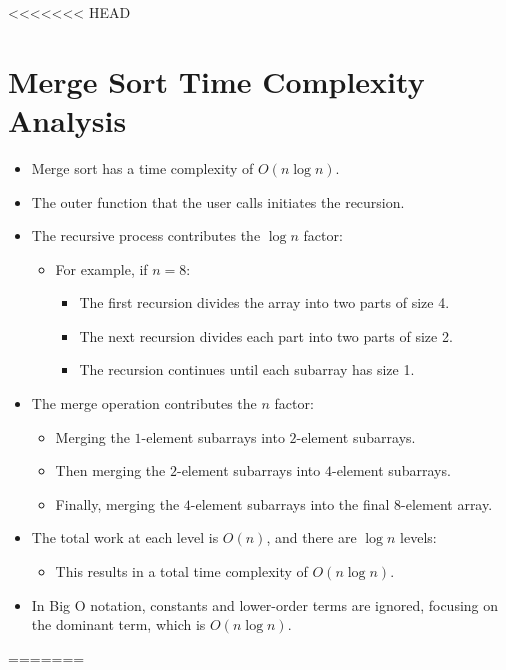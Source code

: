 <<<<<<< HEAD
\section*{Merge Sort Time Complexity Analysis}

\begin{itemize}
    \item Merge sort has a time complexity of \(O(n \log n)\).
    \item The outer function that the user calls initiates the recursion.
    \item The recursive process contributes the \(\log n\) factor:
    \begin{itemize}
        \item For example, if \(n = 8\):
        \begin{itemize}
            \item The first recursion divides the array into two parts of size 4.
            \item The next recursion divides each part into two parts of size 2.
            \item The recursion continues until each subarray has size 1.
        \end{itemize}
    \end{itemize}
    \item The merge operation contributes the \(n\) factor:
    \begin{itemize}
        \item Merging the \(1\)-element subarrays into \(2\)-element subarrays.
        \item Then merging the \(2\)-element subarrays into \(4\)-element subarrays.
        \item Finally, merging the \(4\)-element subarrays into the final \(8\)-element array.
    \end{itemize}
    \item The total work at each level is \(O(n)\), and there are \(\log n\) levels:
    \begin{itemize}
        \item This results in a total time complexity of \(O(n \log n)\).
    \end{itemize}
    \item In Big O notation, constants and lower-order terms are ignored, focusing on the dominant term, which is \(O(n \log n)\).
\end{itemize}
=======
\documentclass{article}
\usepackage{amsmath}


\section*{Merge Sort Time Complexity Analysis}

